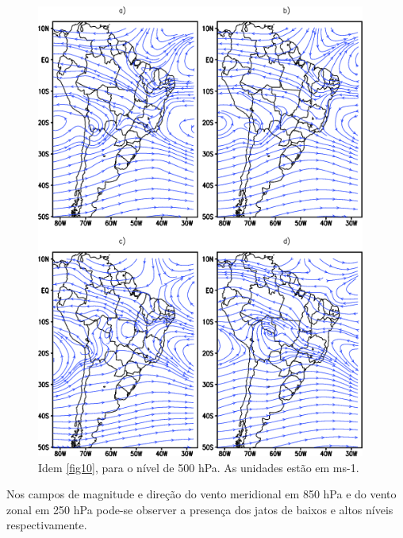 \begin{figure}[!hbp]
\centering
\includegraphics[height=15cm]{./figs/media_corrente_anl_500hPa.png}
\caption{Idem \autoref{fig10}, para o nível de 500 hPa. As unidades estão em ms-1.}
\label{fig14}
\end{figure}

Nos campos de magnitude e direção do vento meridional em 850 hPa e do vento zonal em 250 hPa pode-se observer a presença dos jatos de baixos e altos níveis respectivamente.

